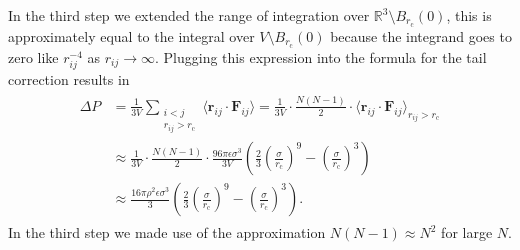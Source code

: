 \documentclass[a4paper,10pt,bibtotoc]{scrartcl}
\begin{document}
In the third step we extended the range of integration over $\mathbb{R}^3\setminus B_{r_\mathrm{c}}(0)$, this is approximately equal to the integral over $V\setminus B_{r_\mathrm{c}}(0)$ because the integrand goes to zero like $r_{ij}^{-4}$ as $r_{ij}\rightarrow\infty$. Plugging this expression into the formula for the tail correction results in
\begin{align}
\begin{split}
\Delta P &= \frac{1}{3V}\sum_{\substack{i<j\\ r_{ij}>r_\mathrm{c}}}\langle\mathbf{r}_{ij}\cdot\mathbf{F}_{ij}\rangle = \frac{1}{3V}\cdot\frac{N(N-1)}{2}\cdot \langle\mathbf{r}_{ij}\cdot\mathbf{F}_{ij}\rangle_{r_{ij}>r_\mathrm{c}}\\
&\approx \frac{1}{3V}\cdot\frac{N(N-1)}{2}\cdot\frac{96\pi\epsilon\sigma^3}{3V}\left(\frac{2}{3}\left(\frac{\sigma}{r_\mathrm{c}}\right)^9-\left(\frac{\sigma}{r_\mathrm{c}}\right)^3\right)\\
&\approx \frac{16\pi\rho^2\epsilon\sigma^3}{3}\left(\frac{2}{3}\left(\frac{\sigma}{r_\mathrm{c}}\right)^9-\left(\frac{\sigma}{r_\mathrm{c}}\right)^3\right).
\end{split}
\end{align}
In the third step we made use of the approximation $N(N-1)\approx N^2$ for large $N$.
\end{document}
